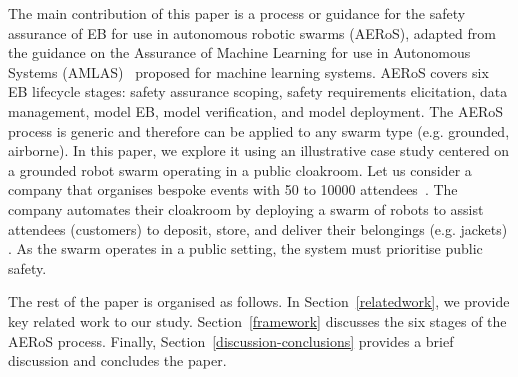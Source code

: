 \documentclass[runningheads]{llncs}
\begin{document}
The main contribution of this paper is a process or guidance for the safety assurance of EB for use in autonomous robotic swarms (AERoS), adapted from the guidance on the Assurance of Machine Learning for use in Autonomous Systems (AMLAS)~\cite{Hawkins2021} proposed for machine learning systems. 
AERoS covers six EB lifecycle stages: safety assurance scoping, safety requirements elicitation, data management, model EB, model verification, and model deployment. 
The AERoS process is generic and therefore can be applied to any swarm type (e.g. grounded, airborne). 
In this paper, we explore it using an illustrative case study centered on a grounded robot swarm operating in a public cloakroom. 
Let us consider a company that organises bespoke events with 50 to 10000 attendees~\cite{Jones2020}. 
The company automates their cloakroom by deploying a swarm of robots to assist attendees (customers) to deposit, store, and deliver their belongings (e.g. jackets) \cite{Jones2020}. 
As the swarm operates in a public setting, the system must prioritise public safety. 

The rest of the paper is organised as follows. 
In Section~\ref{relatedwork}, we provide key related work to our study. Section~\ref{framework} discusses the six stages of the AERoS process. Finally, Section~\ref{discussion-conclusions} provides a brief discussion and concludes the paper. 

\end{document}
